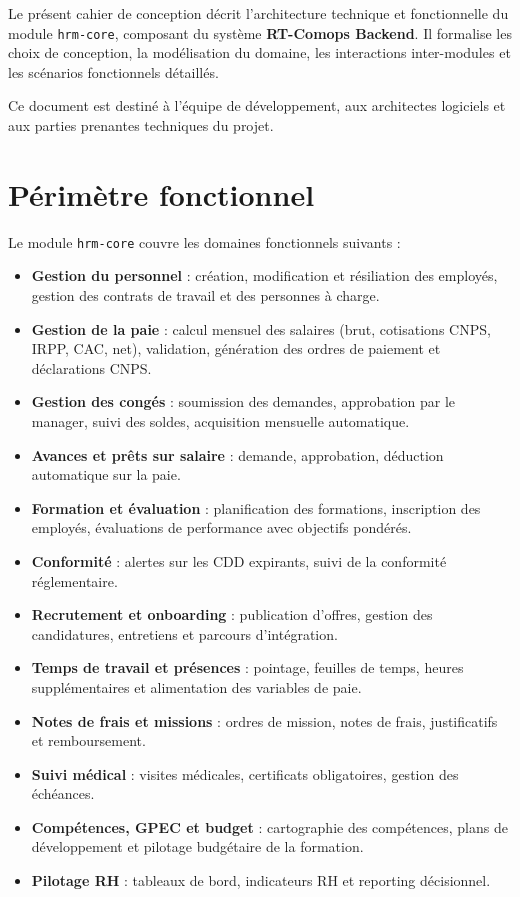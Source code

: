 \documentclass[a4paper,12pt,openany]{book}
\begin{document}
    Le présent cahier de conception décrit l'architecture technique et fonctionnelle du module \texttt{hrm-core}, composant du système \textbf{RT-Comops Backend}. Il formalise les choix de conception, la modélisation du domaine, les interactions inter-modules et les scénarios fonctionnels détaillés.

    Ce document est destiné à l'équipe de développement, aux architectes logiciels et aux parties prenantes techniques du projet.

    \section{Périmètre fonctionnel}

    Le module \texttt{hrm-core} couvre les domaines fonctionnels suivants :

    \begin{itemize}
        \item \textbf{Gestion du personnel} : création, modification et résiliation des employés, gestion des contrats de travail et des personnes à charge.
        \item \textbf{Gestion de la paie} : calcul mensuel des salaires (brut, cotisations CNPS, IRPP, CAC, net), validation, génération des ordres de paiement et déclarations CNPS.
        \item \textbf{Gestion des congés} : soumission des demandes, approbation par le manager, suivi des soldes, acquisition mensuelle automatique.
        \item \textbf{Avances et prêts sur salaire} : demande, approbation, déduction automatique sur la paie.
        \item \textbf{Formation et évaluation} : planification des formations, inscription des employés, évaluations de performance avec objectifs pondérés.
        \item \textbf{Conformité} : alertes sur les CDD expirants, suivi de la conformité réglementaire.
        \item \textbf{Recrutement et onboarding} : publication d'offres, gestion des candidatures, entretiens et parcours d'intégration.
        \item \textbf{Temps de travail et présences} : pointage, feuilles de temps, heures supplémentaires et alimentation des variables de paie.
        \item \textbf{Notes de frais et missions} : ordres de mission, notes de frais, justificatifs et remboursement.
        \item \textbf{Suivi médical} : visites médicales, certificats obligatoires, gestion des échéances.
        \item \textbf{Compétences, GPEC et budget} : cartographie des compétences, plans de développement et pilotage budgétaire de la formation.
        \item \textbf{Pilotage RH} : tableaux de bord, indicateurs RH et reporting décisionnel.
    \end{itemize}
\end{document}
